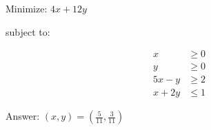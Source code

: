 \documentclass{article}
\begin{document}
\hrulefill
\begin{multicols}{2}

    Minimize: \(4x + 12 y\)

    subject to:

    \begin{align*}
        x & \geq 0\\
        y & \geq 0\\
        5 x - y &\geq 2\\
        x + 2y &\leq 1
    \end{align*}
    

    \columnbreak

    Answer: \( (x, y) = \left(\frac{5}{11}, \frac{3}{11}\right) \)

\end{multicols}
\end{document}
